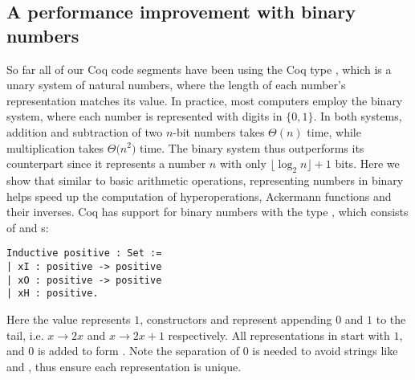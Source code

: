 \subsection{A performance improvement with binary numbers}
So far all of our Coq code segments have been using the Coq type , which is a unary system of natural numbers, where the length of each number's representation matches its value. In practice, most computers employ the binary system, where each number is represented with digits in $\{0, 1\}$. In both systems, addition and subtraction of two $n$-bit numbers takes $\Theta(n)$ time, while multiplication takes $\Theta \big(n^2\big)$ time. The binary system thus outperforms its counterpart since it represents a number $n$ with only $\lfloor \log_2n \rfloor + 1$ bits. Here we show that similar to basic arithmetic operations, representing numbers in binary helps speed up the computation of hyperoperations, Ackermann functions and their inverses. Coq has support for binary numbers with the type , which consists of  and s:
\begin{lstlisting}
Inductive positive : Set :=
| xI : positive -> positive
| xO : positive -> positive
| xH : positive.
\end{lstlisting} 
Here the value  represents $1$, constructors  and  represent appending $0$ and $1$ to the tail, i.e. $x\to 2x$ and $x\to 2x+1$ respectively. All representations in  start with $1$, and $0$ is added to form . Note the separation of $0$ is needed to avoid strings like  and , thus ensure each representation is unique.


